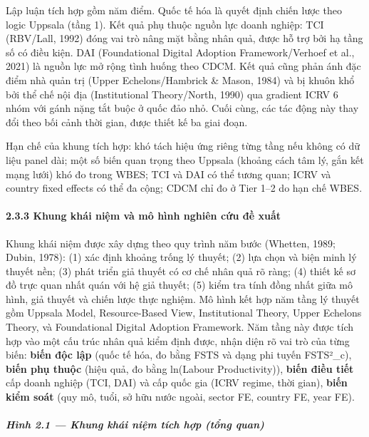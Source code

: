 \documentclass[12pt,a4paper]{article}
\begin{document}
Lập luận tích hợp gồm năm điểm. Quốc tế hóa là quyết định chiến lược
theo logic Uppsala (tầng 1). Kết quả phụ thuộc nguồn lực doanh nghiệp:
TCI (RBV/Lall, 1992) đóng vai trò nâng mặt bằng nhân quả, được hỗ trợ
bởi hạ tầng số có điều kiện. DAI (Foundational Digital Adoption
Framework/Verhoef et al., 2021) là nguồn lực mở rộng tình huống theo
CDCM. Kết quả cũng phản ánh đặc điểm nhà quản trị (Upper
Echelons/Hambrick \& Mason, 1984) và bị khuôn khổ bởi thể chế nội địa
(Institutional Theory/North, 1990) qua gradient ICRV 6 nhóm với gánh
nặng tắt buộc ở quốc đảo nhỏ. Cuối cùng, các tác động này thay đổi theo
bối cảnh thời gian, được thiết kế ba giai đoạn.

Hạn chế của khung tích hợp: khó tách hiệu ứng riêng từng tầng nếu không
có dữ liệu panel dài; một số biến quan trọng theo Uppsala (khoảng cách
tâm lý, gắn kết mạng lưới) khó đo trong WBES; TCI và DAI có thể tương
quan; ICRV và country fixed effects có thể đa cộng; CDCM chỉ đo ở Tier
1--2 do hạn chế WBES.

\hypertarget{233-khung-khuxe1i-niux1ec7m-vuxe0-muxf4-huxecnh-nghiuxean-cux1ee9u-ux111ux1ec1-xuux1ea5t}{%
\paragraph{2.3.3 Khung khái niệm và mô hình nghiên cứu đề
xuất}\label{233-khung-khuxe1i-niux1ec7m-vuxe0-muxf4-huxecnh-nghiuxean-cux1ee9u-ux111ux1ec1-xuux1ea5t}}

Khung khái niệm được xây dựng theo quy trình năm bước (Whetten, 1989;
Dubin, 1978): (1) xác định khoảng trống lý thuyết; (2) lựa chọn và biện
minh lý thuyết nền; (3) phát triển giả thuyết có cơ chế nhân quả rõ
ràng; (4) thiết kế sơ đồ trực quan nhất quán với hệ giả thuyết; (5) kiểm
tra tính đồng nhất giữa mô hình, giả thuyết và chiến lược thực nghiệm.
Mô hình kết hợp năm tầng lý thuyết gồm Uppsala Model, Resource-Based
View, Institutional Theory, Upper Echelons Theory, và Foundational
Digital Adoption Framework. Năm tầng này được tích hợp vào một cấu trúc
nhân quả kiểm định được, nhận diện rõ vai trò của từng biến:
\textbf{biến độc lập} (quốc tế hóa, đo bằng FSTS và dạng phi tuyến
FSTS²\_c), \textbf{biến phụ thuộc} (hiệu quả, đo bằng ln(Labour
Productivity)), \textbf{biến điều tiết} cấp doanh nghiệp (TCI, DAI) và
cấp quốc gia (ICRV regime, thời gian), \textbf{biến kiểm soát} (quy mô,
tuổi, sở hữu nước ngoài, sector FE, country FE, year FE).

\hypertarget{huxecnh-21--khung-khuxe1i-niux1ec7m-tuxedch-hux1ee3p-tux1ed5ng-quan}{%
\subparagraph{Hình 2.1 --- Khung khái niệm tích hợp (tổng
quan)}\label{huxecnh-21--khung-khuxe1i-niux1ec7m-tuxedch-hux1ee3p-tux1ed5ng-quan}}
\end{document}
